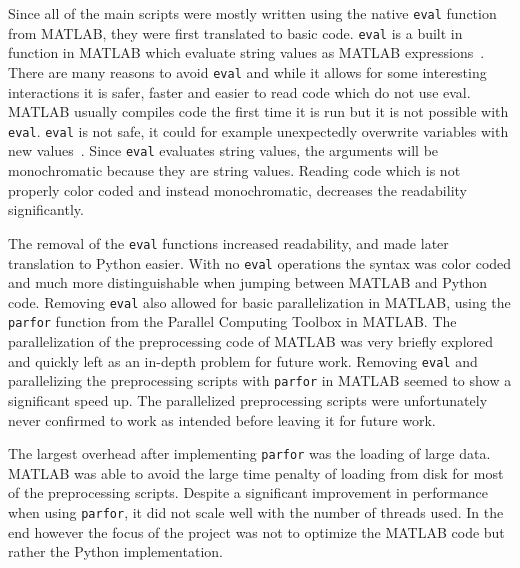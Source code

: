 \documentclass[12pt, a4paper]{article}
\begin{document}
Since all of the main scripts were mostly written using the native \texttt{eval} function from MATLAB, they were first translated to basic code.
\texttt{eval} is a built in function in MATLAB which evaluate string values as MATLAB expressions~\cite{mat:eval}.
There are many reasons to avoid \texttt{eval} and while it allows for some interesting interactions it is safer, faster and easier to read code which do not use eval.
MATLAB usually compiles code the first time it is run but it is not possible with \texttt{eval}.
\texttt{eval} is not safe, it could for example unexpectedly overwrite variables with new values~\cite{matEval}.
Since \texttt{eval} evaluates string values, the arguments will be monochromatic because they are string values.
Reading code which is not properly color coded and instead monochromatic, decreases the readability significantly.

The removal of the \texttt{eval} functions increased readability, and made later translation to Python easier. With no \texttt{eval} operations the syntax was color coded and much more distinguishable when jumping between MATLAB and Python code.
Removing \texttt{eval} also allowed for basic parallelization in MATLAB, using the \texttt{parfor} function from the Parallel Computing Toolbox in MATLAB.
The parallelization of the preprocessing code of MATLAB was very briefly explored and quickly left as an in-depth problem for future work.
Removing \texttt{eval} and parallelizing the preprocessing scripts with \texttt{parfor} in MATLAB seemed to show a significant speed up.
The parallelized preprocessing scripts were unfortunately never confirmed to work as intended before leaving it for future work.

The largest overhead after implementing \texttt{parfor} was the loading of large data. 
MATLAB was able to avoid the large time penalty of loading from disk for most of the preprocessing scripts.
Despite a significant improvement in performance when using \texttt{parfor}, it did not scale well with the number of threads used.
In the end however the focus of the project was not to optimize the MATLAB code but rather the Python implementation.
\end{document}
